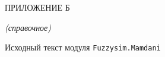 \lstset{style=pythoninlinestyle}

%

 \begin{center}
	ПРИЛОЖЕНИЕ Б
	
	\textit{(справочное)}
\end{center}


\begin{center}
	Исходный текст модуля \lstinline!Fuzzysim.Mamdani!
\end{center}



